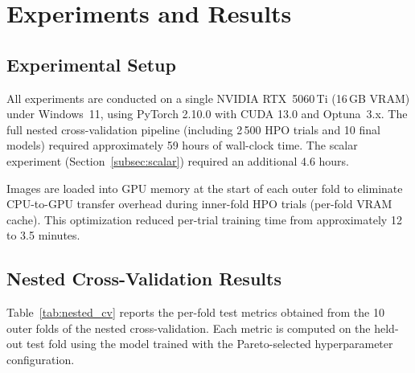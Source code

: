 
\section{Experiments and Results}
\label{sec:experiments}

\subsection{Experimental Setup}
\label{subsec:setup}

All experiments are conducted on a single NVIDIA RTX~5060\,Ti (16\,GB VRAM) under
Windows~11, using PyTorch 2.10.0 with CUDA 13.0 and Optuna~3.x. The full nested
cross-validation pipeline (including 2\,500 HPO trials and 10 final models) required
approximately 59 hours of wall-clock time. The scalar experiment
(Section~\ref{subsec:scalar}) required an additional 4.6 hours.

Images are loaded into GPU memory at the start of each outer fold to eliminate
CPU-to-GPU transfer overhead during inner-fold HPO trials (per-fold VRAM cache).
This optimization reduced per-trial training time from approximately 12 to 3.5 minutes.

\subsection{Nested Cross-Validation Results}
\label{subsec:ncv_results}

Table~\ref{tab:nested_cv} reports the per-fold test metrics obtained from the 10
outer folds of the nested cross-validation. Each metric is computed on the held-out
test fold using the model trained with the Pareto-selected hyperparameter
configuration.

